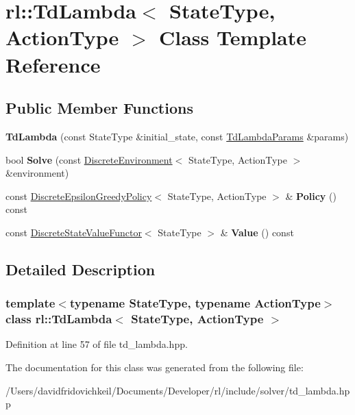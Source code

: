 \hypertarget{classrl_1_1_td_lambda}{}\section{rl\+:\+:Td\+Lambda$<$ State\+Type, Action\+Type $>$ Class Template Reference}
\label{classrl_1_1_td_lambda}
\subsection*{Public Member Functions}
\begin{DoxyCompactItemize}
\item 
\hypertarget{classrl_1_1_td_lambda_a86d18da90b32c89f19b2e7eadcb4c5e4}{}\label{classrl_1_1_td_lambda_a86d18da90b32c89f19b2e7eadcb4c5e4} 
{\bfseries Td\+Lambda} (const State\+Type \&initial\+\_\+state, const \hyperlink{structrl_1_1_td_lambda_params}{Td\+Lambda\+Params} \&params)
\item 
\hypertarget{classrl_1_1_td_lambda_ab8eec2b22d9995865a22df9652dc35f3}{}\label{classrl_1_1_td_lambda_ab8eec2b22d9995865a22df9652dc35f3} 
bool {\bfseries Solve} (const \hyperlink{classrl_1_1_discrete_environment}{Discrete\+Environment}$<$ State\+Type, Action\+Type $>$ \&environment)
\item 
\hypertarget{classrl_1_1_td_lambda_aa76044eb47c107864d6ce575cdde7e87}{}\label{classrl_1_1_td_lambda_aa76044eb47c107864d6ce575cdde7e87} 
const \hyperlink{classrl_1_1_discrete_epsilon_greedy_policy}{Discrete\+Epsilon\+Greedy\+Policy}$<$ State\+Type, Action\+Type $>$ \& {\bfseries Policy} () const
\item 
\hypertarget{classrl_1_1_td_lambda_a411b370a455d6a6c145a2eb11f5b21fd}{}\label{classrl_1_1_td_lambda_a411b370a455d6a6c145a2eb11f5b21fd} 
const \hyperlink{structrl_1_1_discrete_state_value_functor}{Discrete\+State\+Value\+Functor}$<$ State\+Type $>$ \& {\bfseries Value} () const
\end{DoxyCompactItemize}


\subsection{Detailed Description}
\subsubsection*{template$<$typename State\+Type, typename Action\+Type$>$\newline
class rl\+::\+Td\+Lambda$<$ State\+Type, Action\+Type $>$}



Definition at line 57 of file td\+\_\+lambda.\+hpp.



The documentation for this class was generated from the following file\+:\begin{DoxyCompactItemize}
\item 
/\+Users/davidfridovichkeil/\+Documents/\+Developer/rl/include/solver/td\+\_\+lambda.\+hpp\end{DoxyCompactItemize}
